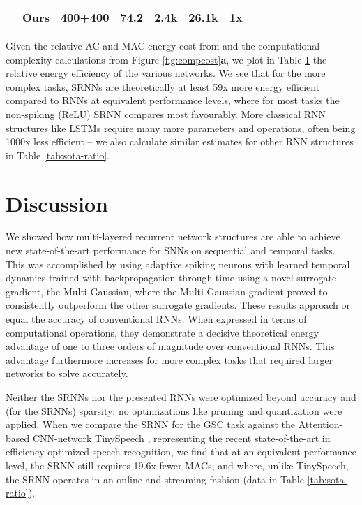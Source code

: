 \documentclass[fleqn,10pt]{wlscirep}
\begin{document}
\begin{table}[]
{\begin{tabular}{|l|l|l|l|l|l|l|l|l|l|l|l|l|l|}
                      & \cellcolor{green}Ours                    & \cellcolor{green}400+400                  & \cellcolor{green}74.2                & \cellcolor{green}2.4k            & \cellcolor{green}26.1k          & \cellcolor{green}\bf 1x                     
                      &                &                   &                &               &        &          &                     \\ \hline
\end{tabular}
}\label{tab:energy}
\end{table}


Given the relative AC and MAC energy cost from  \cite{horowitz20141,roy2019towards,kundu2021spike} and the computational complexity calculations from Figure \ref{fig:compcost}\textbf{a}, we plot in Table \ref{tab:energy} the relative energy efficiency of the various networks. We see that for the more complex tasks, SRNNs are theoretically at least 59x more energy efficient compared to RNNs at equivalent performance levels, where for most tasks the non-spiking (ReLU) SRNN compares most favourably. 
More classical RNN structures like LSTMs require many more parameters and operations, often being 1000x less efficient -- we also calculate similar estimates for other RNN structures in Table \ref{tab:sota-ratio}.





\section*{Discussion}



We showed how multi-layered recurrent network structures are able to achieve new state-of-the-art performance for SNNs on sequential and temporal tasks. This was accomplished by using adaptive spiking neurons with learned temporal dynamics trained with backpropagation-through-time using a novel surrogate gradient, the Multi-Gaussian, where the Multi-Gaussian gradient proved to consistently outperform the other  surrogate gradients. These results approach or equal the accuracy of conventional RNNs. When expressed in terms of computational operations, they demonstrate a decisive theoretical energy advantage of one to three orders of magnitude over conventional RNNs. This advantage furthermore increases for more complex tasks that required larger networks to solve accurately.


Neither the SRNNs nor the presented RNNs were optimized beyond accuracy and (for the SRNNs) sparsity: no optimizations like pruning and quantization were applied. When we compare the SRNN for the GSC task against the Attention-based CNN-network TinySpeech \cite{wong2020tinyspeech}, representing the recent state-of-the-art in efficiency-optimized speech recognition, we find that at an equivalent performance level, the SRNN still requires 19.6x fewer MACs, and where, unlike TinySpeech, the SRNN operates in an online and streaming fashion (data in Table \ref{tab:sota-ratio}). 
\end{document}
